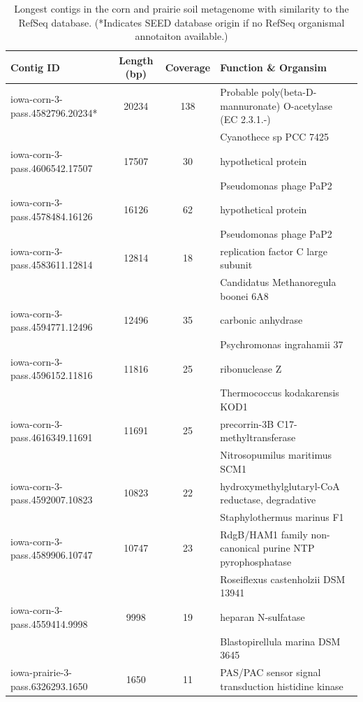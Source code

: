 \documentclass{pnastwo}
\begin{document}
\begin{table}
\caption{Longest contigs in the corn and prairie soil metagenome with similarity to the RefSeq database. (*Indicates SEED database origin if no RefSeq organismal annotaiton available.)}
\begin{tabular}{@{\extracolsep{\fill}}lccl}
\hline
Contig ID & Length (bp) & Coverage &  Function \& Organsim \\
 \hline
iowa-corn-3-pass.4582796.20234*	&	20234	&	138	&	Probable poly(beta-D-mannuronate) O-acetylase (EC 2.3.1.-)	\\
	&		&		&	Cyanothece sp PCC 7425	\\
iowa-corn-3-pass.4606542.17507	&	17507	&	30	&	hypothetical protein	\\
	&		&		&	Pseudomonas phage PaP2	\\
iowa-corn-3-pass.4578484.16126	&	16126	&	62	&	hypothetical protein	\\
	&		&		&	Pseudomonas phage PaP2	\\
iowa-corn-3-pass.4583611.12814	&	12814	&	18	&	replication factor C large subunit	\\
	&		&		&	Candidatus Methanoregula boonei 6A8	\\
iowa-corn-3-pass.4594771.12496	&	12496	&	35	&	carbonic anhydrase	\\
	&		&		&	Psychromonas ingrahamii 37	\\
iowa-corn-3-pass.4596152.11816	&	11816	&	25	&	ribonuclease Z	\\
	&		&		&	Thermococcus kodakarensis KOD1	\\
iowa-corn-3-pass.4616349.11691	&	11691	&	25	&	precorrin-3B C17-methyltransferase	\\
	&		&		&	Nitrosopumilus maritimus SCM1	\\
iowa-corn-3-pass.4592007.10823	&	10823	&	22	&	hydroxymethylglutaryl-CoA reductase, degradative	\\
	&		&		&	Staphylothermus marinus F1	\\
iowa-corn-3-pass.4589906.10747	&	10747	&	23	&	RdgB/HAM1 family non-canonical purine NTP pyrophosphatase	\\
	&		&		&	Roseiflexus castenholzii DSM 13941	\\
iowa-corn-3-pass.4559414.9998&	9998	&	19	&	heparan N-sulfatase	\\
	&		&		&	Blastopirellula marina DSM 3645	\\
iowa-prairie-3-pass.6326293.1650	&	1650	&	11	&	PAS/PAC sensor signal transduction histidine kinase	\\

\end{tabular}
\end{table}
\end{document}
